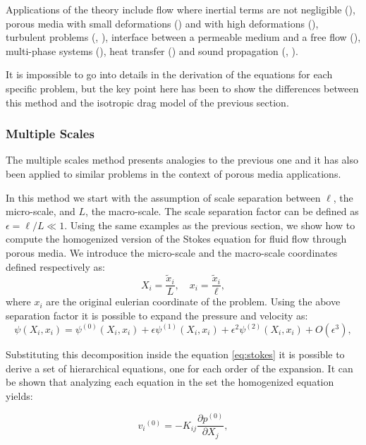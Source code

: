 Applications of the theory include flow where inertial terms are not negligible (\citet{whitaker1996forchheimer}), porous media with small deformations (\citet{whitaker1986flow2}) and with high deformations (\citet{hussong2011continuum}), turbulent problems (\citet{soulaine2014}, \citet{breugem2006influence}), interface between a permeable medium and a free flow (\citet{beaver}), multi-phase systems (\citet{whitaker1973transport}), heat transfer (\citet{carbonell1984heat}) and sound propagation (\citet{firdaouss1998some}, \citet{lafarge1998sound}).

It is impossible to go into details in the derivation of the equations for each specific problem, but the key point here has been to show the differences between this method and the isotropic drag model of the previous section.

\subsubsection{Multiple Scales}

The multiple scales method presents analogies to the previous one and it has also been applied to similar problems in the context of porous media applications.

In this method we start with the assumption of scale separation between $\ell$, the micro-scale, and $L$, the macro-scale.
The scale separation factor can be defined as $\epsilon = \ell/L \ll 1$.
Using the same examples as the previous section, we show how to compute the homogenized version of the Stokes equation for fluid flow through porous media.
We introduce the micro-scale and the macro-scale coordinates defined respectively as:
$$
 X_i = \dfrac{\tilde{x}_i}{L}, \quad   x_i = \dfrac{\tilde{x}_i}{\ell},
$$
where $x_i$ are the original eulerian coordinate of the problem.
Using the above separation factor it is possible to expand the pressure and velocity as:
$$
\psi(X_i, x_i) = \psi^{(0)}(X_i, x_i)  +\epsilon \psi^{(1)}(X_i, x_i) +\epsilon^2 \psi^{(2)}(X_i, x_i) +O(\epsilon^3),
$$

Substituting this decomposition inside the equation \eqref{eq:stokes} it is possible to derive a set of hierarchical equations, one for each order of the expansion.
It can be shown that analyzing each equation in the set the homogenized equation yields:

\begin{equation}
{v_i}^{(0)} = -K_{ij} \dfrac{\partial p^{(0)}}{\partial X_j},
\label{eq:darcy_ms}
\end{equation} 

